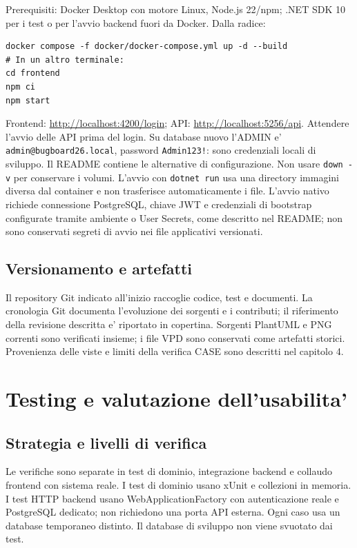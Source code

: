 \documentclass[11pt,a4paper,oneside]{report}
\begin{document}
Prerequisiti: Docker Desktop con motore Linux, Node.js 22/npm; .NET SDK 10
per i test o per l'avvio backend fuori da Docker. Dalla radice:
\begin{verbatim}
docker compose -f docker/docker-compose.yml up -d --build
# In un altro terminale:
cd frontend
npm ci
npm start
\end{verbatim}
Frontend: \url{http://localhost:4200/login}; API:
\url{http://localhost:5256/api}. Attendere l'avvio delle API prima del login.
Su database nuovo l'ADMIN e' \texttt{admin@bugboard26.local}, password
\texttt{Admin123!}: sono credenziali locali di sviluppo. Il README contiene
le alternative di configurazione. Non usare \texttt{down -v} per conservare
i volumi. L'avvio con \texttt{dotnet run} usa una directory immagini diversa
dal container e non trasferisce automaticamente i file. L'avvio nativo
richiede connessione PostgreSQL, chiave JWT e credenziali di bootstrap
configurate tramite ambiente o User Secrets, come descritto nel README;
non sono conservati segreti di avvio nei file applicativi versionati.

\section{Versionamento e artefatti}
Il repository Git indicato all'inizio raccoglie codice, test e documenti.
La cronologia Git documenta l'evoluzione dei sorgenti e i contributi;
il riferimento della revisione descritta e' riportato in copertina.
Sorgenti PlantUML e PNG correnti sono verificati insieme; i file VPD sono
conservati come artefatti storici. Provenienza delle viste e limiti della
verifica CASE sono descritti nel capitolo 4.

\chapter{Testing e valutazione dell'usabilita'}
\section{Strategia e livelli di verifica}
Le verifiche sono separate in test di dominio, integrazione backend e
collaudo frontend con sistema reale. I test di dominio usano xUnit e
collezioni in memoria. I test HTTP backend usano WebApplicationFactory
con autenticazione reale e PostgreSQL dedicato; non richiedono una porta
API esterna. Ogni caso usa un database temporaneo distinto. Il database
di sviluppo non viene svuotato dai test.
\end{document}
